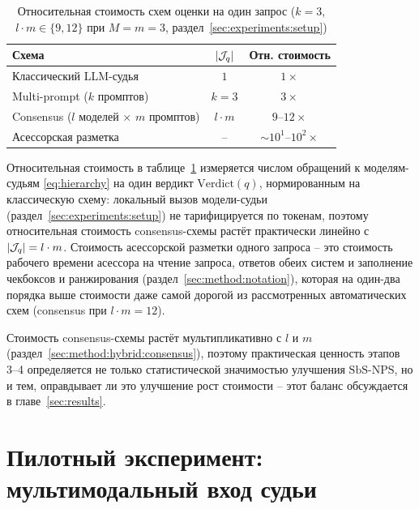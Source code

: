 \begin{table}[htbp]
    \centering
    \caption{Относительная стоимость схем оценки на один запрос
    ($k = 3$, $l \cdot m \in \{9, 12\}$ при $M = m = 3$,
    раздел~\ref{sec:experiments:setup})}
    \label{tab:cost-comparison}
    \begin{tabular}{lcc}
        \toprule
        Схема & $\left\lvert\mathcal{J}_q\right\rvert$ & Отн. стоимость \\
        \midrule
        Классический LLM-судья & $1$ & $1\times$ \\
        Multi-prompt ($k$ промптов) & $k = 3$ & $3\times$ \\
        Consensus ($l$ моделей $\times$ $m$ промптов) & $l \cdot m$ &
            $9$--$12\times$ \\
        Асессорская разметка & -- & $\sim 10^1$--$10^2\times$ \\
        \bottomrule
    \end{tabular}
\end{table}

Относительная стоимость в таблице~\ref{tab:cost-comparison} измеряется
числом обращений к моделям-судьям \eqref{eq:hierarchy} на один вердикт
$\mathrm{Verdict}(q)$, нормированным на классическую схему: локальный
вызов модели-судьи (раздел~\ref{sec:experiments:setup}) не тарифицируется
по токенам, поэтому относительная стоимость consensus-схемы растёт
практически линейно с $\left\lvert\mathcal{J}_q\right\rvert = l \cdot m$.
Стоимость асессорской разметки одного запроса -- это стоимость
рабочего времени асессора на чтение запроса, ответов обеих систем и
заполнение чекбоксов и ранжирования (раздел~\ref{sec:method:notation}),
которая на один-два порядка выше стоимости даже самой дорогой из
рассмотренных автоматических схем (consensus при $l \cdot m = 12$).

Стоимость consensus-схемы растёт мультипликативно с $l$ и $m$
(раздел~\ref{sec:method:hybrid:consensus}), поэтому практическая
ценность этапов 3--4 определяется не только статистической значимостью
улучшения $\mathrm{SbS\text{-}NPS}$, но и тем, оправдывает ли это
улучшение рост стоимости -- этот баланс обсуждается в
главе~\ref{sec:results}.

\section{Пилотный эксперимент: мультимодальный вход судьи}
\label{sec:experiments:pilot-multimodal}


